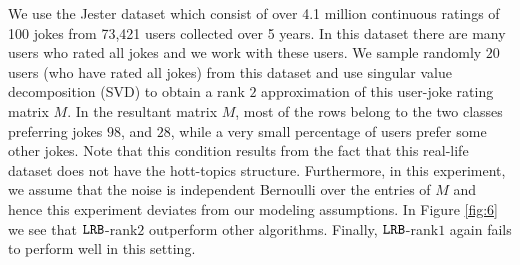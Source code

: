 We use the Jester dataset \citep{goldberg2001eigentaste} which consist of over 4.1 million continuous ratings of 100 jokes from 73,421 users collected over 5 years. In this dataset there are many users who rated all jokes and we work with these users. We sample randomly $20$ users (who have rated all jokes) from this dataset and use singular value decomposition (SVD) to obtain a rank $2$ approximation of this user-joke rating matrix $M$. In the resultant matrix $M$, most of the rows belong to the two classes preferring jokes $98$, and $28$, while a very small percentage of users prefer some other jokes. Note that this condition results from the fact that this real-life dataset does not have the hott-topics structure. Furthermore, in this experiment, we assume that the noise is independent Bernoulli over the entries of $M$ and hence this experiment deviates from our modeling assumptions. In Figure \ref{fig:6} we see that ${\tt LRB}$-rank$2$ outperform other algorithms. Finally, ${\tt LRB}$-rank$1$ again fails to perform well in this setting.



